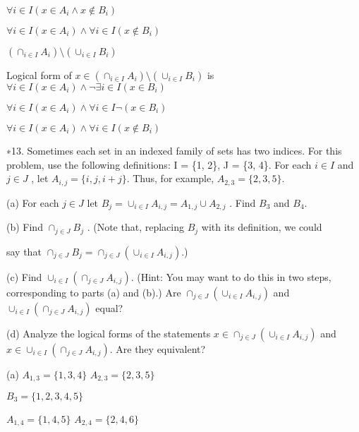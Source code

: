 \documentclass{article}
\begin{document}
$\forall i \in I (x \in A_i \land x \notin B_i)$

$\forall i \in I (x \in A_i) \land \forall i \in I (x \notin B_i)$

\vspace{10pt}

$(\cap_{i \in I} A_i) \setminus (\cup_{i \in I} B_i)$

Logical form of $x \in (\cap_{i \in I} A_i) \setminus (\cup_{i \in I} B_i)$ is $\forall i \in I (x \in A_i) \land \neg \exists i \in I (x \in B_i)$

$\forall i \in I (x \in A_i) \land \forall i \in I \neg (x \in B_i)$

$\forall i \in I (x \in A_i) \land \forall i \in I (x \notin B_i)$

\vspace{30pt}

∗13. Sometimes each set in an indexed family of sets has two indices. For
this problem, use the following definitions: I = \{1, 2\}, J = \{3, 4\}. For
each $i \in I$ and $j \in J$ , let $A_{i,j} = \{i, j,i + j\}$. Thus, for example,
$A_{2,3} = \{2, 3, 5\}$.

\hspace{12pt}(a) For each $j \in J$ let $B_j = \cup_{i \in I} A_{i,j} = A_{1,j} \cup A_{2,j}$ . Find $B_3$ and $B_4$.

\hspace{12pt}(b) Find $\cap_{j \in J} B_j$ . (Note that, replacing $B_j$ with its definition, we could

\hspace{12pt}say that $\cap_{j \in J} B_j = \cap_{j \in J} (\cup_{i \in I} A_{i,j})$.)

\hspace{12pt}(c) Find $\cup_{i \in I} (\cap_{j \in J} A_{i,j})$. (Hint: You may want to do this in two
steps, corresponding to parts (a) and (b).) Are $\cap_{j \in J} (\cup_{i \in I} A_{i,j})$ and $\cup_{i \in I} (\cap_{j \in J} A_{i,j})$ equal?

\hspace{12pt}(d) Analyze the logical forms of the statements $x \in \cap_{j \in J} (\cup_{i \in I} A_{i,j})$ and
$x \in \cup_{i \in I} (\cap_{j \in J} A_{i,j})$. Are they equivalent?
\vspace{30pt}

(a) $A_{1,3} = \{1, 3, 4\}$ $A_{2,3} = \{2, 3, 5\}$

$B_3 = \{1, 2, 3, 4, 5\}$

$A_{1,4} = \{1, 4, 5\}$ $A_{2,4} = \{2, 4, 6\}$
\end{document}
